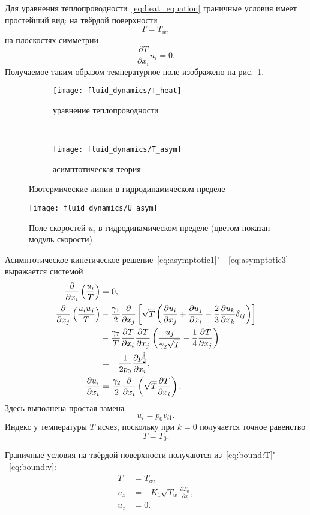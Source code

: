 \documentclass[english,russian,a4paper,12pt]{article}
\newcommand{\pder}[2][]{\frac{\partial#1}{\partial#2}}
\begin{document}
Для уравнения теплопроводности~\eqref{eq:heat_equation} граничные условия имеет простейший вид:
на твёрдой поверхности
\[ T = T_w, \]
на плоскостях симметрии
\[ \pder[T]{x_i}n_i = 0. \]
Получаемое таким образом температурное поле изображено на рис.~\ref{fig:isotemp:heat}.

\begin{figure}[ht]
	\centering
	\begin{subfigure}{0.45\textwidth}
		\centering
		\texttt{[image: fluid\_dynamics/T\_heat]}
		\caption{уравнение теплопроводности}
		\label{fig:isotemp:heat}
	\end{subfigure}
	~
	\begin{subfigure}{0.45\textwidth}
		\centering
		\texttt{[image: fluid\_dynamics/T\_asym]}
		\caption{асимптотическая теория}
		\label{fig:isotemp:asym}
	\end{subfigure}
	\caption{Изотермические линии в гидродинамическом пределе}\label{fig:isotemp}
\end{figure}

\begin{figure}[ht]
	\centering
	\texttt{[image: fluid\_dynamics/U\_asym]}
	\caption{Поле скоростей \(u_i\) в гидродинамическом пределе (цветом показан модуль скорости)}\label{fig:velocity:asym}
\end{figure}

Асимптотическое кинетическое решение~\eqref{eq:asymptotic1}"--~\eqref{eq:asymptotic3} выражается системой
\begin{align}
	\pder{x_i}\left(\frac{u_i}T\right) &= 0, \label{eq:as:cont} \\
	\pder{x_j}\left(\frac{u_iu_j}{T}\right)
		&-\frac{\gamma_1}2\pder{x_j}\left[\sqrt{T}\left(
			\pder[u_i]{x_j}+\pder[u_j]{x_i}-\frac23\pder[u_k]{x_k}\delta_{ij}\right
		)\right] \notag\\
		&- \frac{\gamma_7}T\pder[T]{x_i}\pder[T]{x_j}\left(\frac{u_j}{\gamma_2\sqrt{T}} - \frac{1}4\pder[T]{x_j}\right) \notag\\
		&= -\frac1{2p_0}\pder[p_2^\dag]{x_i}, \label{eq:as:mom} \\
	\pder[u_i]{x_i} &= \frac{\gamma_2}2\pder{x_i}\left(\sqrt{T}\pder[T]{x_i}\right). \label{eq:as:temp}
\end{align}
Здесь выполнена простая замена
\[ u_i = p_0v_{i1}. \]
Индекс у температуры \(T\) исчез, поскольку при \(k=0\) получается точное равенство \[T=T_0.\]

Граничные условия на твёрдой поверхности получаются из~\eqref{eq:bound:T}"--~\eqref{eq:bound:v}:
\begin{align*}
	T &= T_w, \\
	u_x &= -K_1\sqrt{T_w}\pder[T_w]{x}, \\
	u_z &= 0.
\end{align*}
\end{document}
